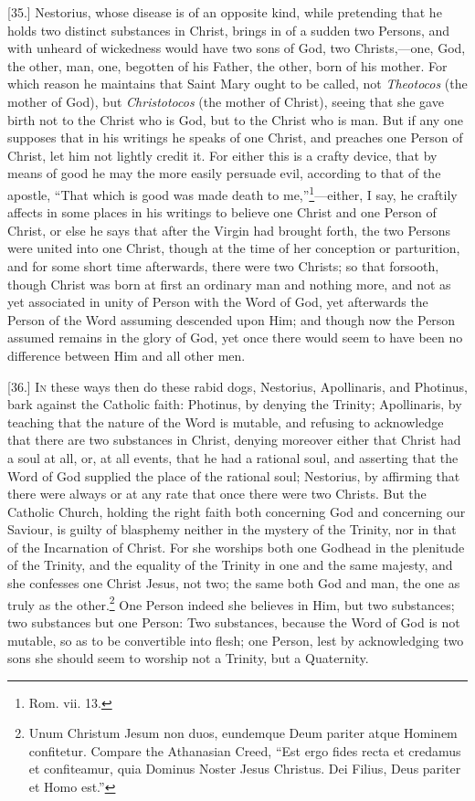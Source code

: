 [35.] Nestorius, whose disease is of an opposite kind, while pretending that he holds two distinct substances in Christ, brings in of a sudden two Persons, and with unheard of wickedness would have two sons of God, two Christs,—one, God, the other, man, one, begotten of his Father, the other, born of his mother. For which reason he maintains that Saint Mary ought to be called, not \emph{Theotocos} (the mother of God), but \emph{Christotocos} (the mother of Christ), seeing that she gave birth not to the Christ who is God, but to the Christ who is man. But if any one supposes that in his writings he speaks of one Christ, and preaches one Person of Christ, let him not lightly credit it. For either this is a crafty device, that by means of good he may the more easily persuade evil, according to that of the apostle, “That which is good was made death to me,”\footnote{Rom. vii. 13.}—either, I say, he craftily affects in some places in his writings to believe one Christ and one Person of Christ, or else he says that after the Virgin had brought forth, the two Persons were united into one Christ, though at the time of her conception or parturition, and for some short time afterwards, there were two Christs; so that forsooth, though Christ was born at first an ordinary man and nothing more, and not as yet associated in unity of Person with the Word of God, yet afterwards the Person of the Word assuming descended upon Him; and though now the Person assumed remains in the glory of God, yet once there would seem to have been no difference between Him and all other men.


[36.] \textsc{In} these ways then do these rabid dogs, Nestorius, Apollinaris, and Photinus, bark against the Catholic faith: Photinus, by denying the Trinity; Apollinaris, by teaching that the nature of the Word is mutable, and refusing to acknowledge that there are two substances in Christ, denying moreover either that Christ had a soul at all, or, at all events, that he had a rational soul, and asserting that the Word of God supplied the place of the rational soul; Nestorius, by affirming that there were always or at any rate that once there were two Christs. But the Catholic Church, holding the right faith both concerning God and concerning our Saviour, is guilty of blasphemy neither in the mystery of the Trinity, nor in that of the Incarnation of Christ. For she worships both one Godhead in the plenitude of the Trinity, and the equality of the Trinity in one and the same majesty, and she confesses one Christ Jesus, not two; the same both God and man, the one as truly as the other.\footnote{Unum Christum Jesum non duos, eundemque Deum pariter atque Hominem confitetur. Compare the Athanasian Creed, “Est ergo fides recta et credamus et confiteamur, quia Dominus Noster Jesus Christus. Dei Filius, Deus pariter et Homo est.”} One Person indeed she believes in Him, but two substances; two substances but one Person: Two substances, because the Word of God is not mutable, so as to be convertible into flesh; one Person, lest by acknowledging two sons she should seem to worship not a Trinity, but a Quaternity.

